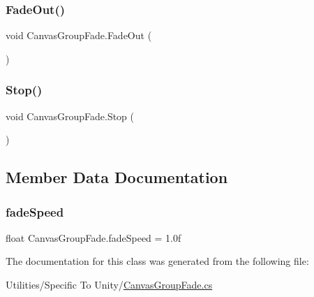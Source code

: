 \mbox{\label{class_canvas_group_fade_a80dceb19ea1925d62e8eec5d9d41c498}} 
\subsubsection{\texorpdfstring{Fade\+Out()}{FadeOut()}}
{\footnotesize\ttfamily void Canvas\+Group\+Fade.\+Fade\+Out (\begin{DoxyParamCaption}{ }\end{DoxyParamCaption})\hspace{0.3cm}{\ttfamily [inline]}}

\mbox{\label{class_canvas_group_fade_a262fee68d7b7f75b31ad036a0cc5a0e2}} 
\subsubsection{\texorpdfstring{Stop()}{Stop()}}
{\footnotesize\ttfamily void Canvas\+Group\+Fade.\+Stop (\begin{DoxyParamCaption}{ }\end{DoxyParamCaption})\hspace{0.3cm}{\ttfamily [inline]}}



\subsection{Member Data Documentation}
\mbox{\label{class_canvas_group_fade_a7eea4c7216b60867b3d24ffaf023257e}} 
\subsubsection{\texorpdfstring{fade\+Speed}{fadeSpeed}}
{\footnotesize\ttfamily float Canvas\+Group\+Fade.\+fade\+Speed = 1.\+0f}



The documentation for this class was generated from the following file\+:\begin{DoxyCompactItemize}
\item 
Utilities/\+Specific To Unity/\hyperlink{_canvas_group_fade_8cs}{Canvas\+Group\+Fade.\+cs}\end{DoxyCompactItemize}
